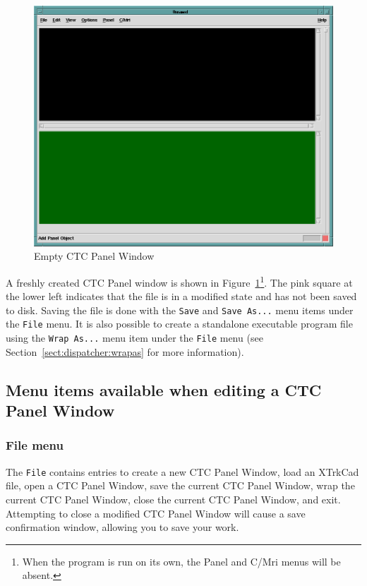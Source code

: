 \begin{figure}[hbpt]
\begin{centering}
\includegraphics[width=5in]{DISPEmptyCTCPanel.png}
\caption{Empty CTC Panel Window}
\label{fig:dispatcher:emptyCTCPanel}
\end{centering}
\end{figure}
A freshly created CTC Panel window is shown in
Figure~\ref{fig:dispatcher:emptyCTCPanel}\footnote{When the program is
run on its own, the Panel and C/Mri menus will be absent.}. The pink
square at the lower left indicates that the file is in a modified state
and has not been saved to disk.  Saving the file is done with the
\verb=Save= and \verb=Save As...= menu items under the \verb=File= menu.
It is also possible to create a standalone executable program file using
the \verb=Wrap As...= menu item under the \verb=File= menu (see
Section~\ref{sect:dispatcher:wrapas} for more information).

\subsection{Menu items available when editing a CTC Panel Window}

\subsubsection{File menu}

The \verb=File= contains entries to create a new CTC Panel Window, load
an XTrkCad file, open a CTC Panel Window, save the current CTC Panel
Window, wrap the current CTC Panel Window, close the current CTC Panel
Window, and exit.  Attempting to close a modified CTC Panel Window will
cause a save confirmation window, allowing you to save your work.


